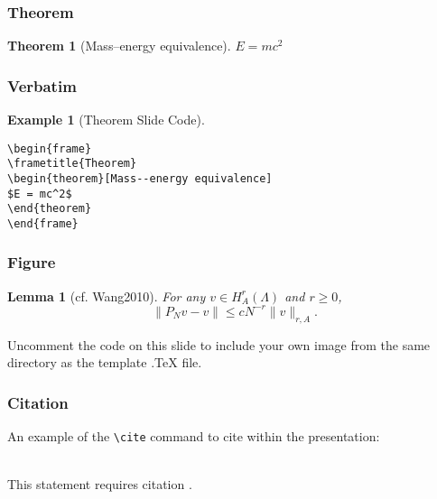 \documentclass[12pt]{beamer}
\newtheorem{thm}{Theorem}
\numberwithin{thm}{section}
\numberwithin{defn}{section}
\newtheorem{lmm}{Lemma}
\numberwithin{lmm}{section}
\theoremstyle{example}
\newtheorem{exam}{Example}
\numberwithin{figure}{section}
\numberwithin{table}{section}
\numberwithin{equation}{section}
\begin{document}

\begin{frame}
\frametitle{Theorem}
\begin{thm}[Mass--energy equivalence]
$E = mc^2$
\end{thm}
\end{frame}


\begin{frame}[fragile] %
\frametitle{Verbatim}
\begin{exam}[Theorem Slide Code]
\begin{verbatim}
\begin{frame}
\frametitle{Theorem}
\begin{theorem}[Mass--energy equivalence]
$E = mc^2$
\end{theorem}
\end{frame}\end{verbatim}
\end{exam}
\end{frame}





\begin{frame}
\frametitle{Figure}
\begin{lmm}[cf. Wang2010]
  For any $v \in H_{A}^{r}(\Lambda)$ and $r \geq 0$,
  \begin{equation}\label{ProjIneqn}
    \|P_{N} v-v\| \leq c N^{-r}\|v\|_{r, A}.
  \end{equation}
\end{lmm}

Uncomment the code on this slide to include your own image from the same directory as the template .TeX file.
\end{frame}


\begin{frame}[fragile] %

\frametitle{Citation}
An example of the \verb|\cite| command to cite within the presentation:\\~

This statement requires citation \cite{p1}.
\end{frame}
\end{document}
